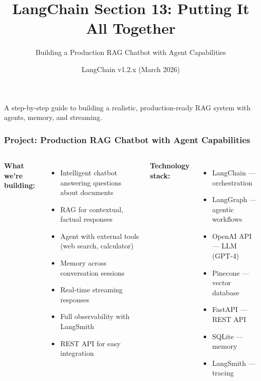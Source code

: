 \documentclass[aspectratio=169,11pt]{beamer}
\title{LangChain Section 13: Putting It All Together}
\subtitle{Building a Production RAG Chatbot with Agent Capabilities}
\author{LangChain v1.2.x (March 2026)}
\date{}
\begin{document}
\begin{frame}
  \titlepage
  \begin{center}
    {\small A step-by-step guide to building a realistic, production-ready RAG system with agents, memory, and streaming.}
  \end{center}
\end{frame}

\begin{frame}
  \frametitle{Project: Production RAG Chatbot with Agent Capabilities}

  \begin{columns}[T]
    \textbf{What we're building:}
    \begin{itemize}
      \item Intelligent chatbot answering questions about documents
      \item RAG for contextual, factual responses
      \item Agent with external tools (web search, calculator)
      \item Memory across conversation sessions
      \item Real-time streaming responses
      \item Full observability with LangSmith
      \item REST API for easy integration
    \end{itemize}

    \textbf{Technology stack:}
    \begin{itemize}
      \item LangChain --- orchestration
      \item LangGraph --- agentic workflows
      \item OpenAI API --- LLM (GPT-4)
      \item Pinecone --- vector database
      \item FastAPI --- REST API
      \item SQLite --- memory
      \item LangSmith --- tracing
    \end{itemize}
  \end{columns}
\end{frame}
\end{document}
